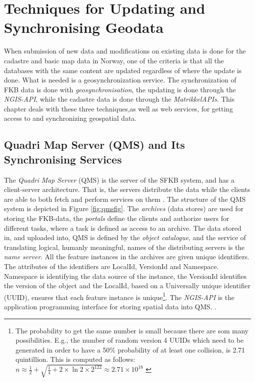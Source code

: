 \chapter{Techniques for Updating and Synchronising Geodata} \label{chap:tech}
When submission of new data and modifications on existing data is done for the cadastre and basic map data in Norway, one of the criteria is that all the databases with the same content are updated regardless of where the update is done. What is needed is a geosynchronization service. The synchronization of FKB data is done with \textit{geosynchronisation}, the updating is done through the \textit{NGIS-API}, while the cadastre data is done through the \textit{MatrikkelAPIs}.  This chapter deals with these three techniques,as well as web services, for getting access to and synchronizing geospatial data.  


\section{Quadri Map Server (QMS) and Its Synchronising Services}\label{ngis}
The \textit{Quadri Map Server} (QMS) is the server of the SFKB system,
and has a client-server architecture. That is, the servers distribute the data while the clients are able to both fetch and perform services on them \citep{NorkartAS2010}. 
The structure of the QMS system
is depicted in Figure \ref{fig:qmsfig}. The \textit{archives} (data stores) are used for storing the FKB-data, the \textit{portals} define the clients and authorize users for different tasks, where a task is defined as access to an archive. The data stored in, and uploaded into, QMS is defined by the \textit{object catalogue}, and the service of translating logical, humanly meaningful, names of the distributing servers is the \textit{name server}. All the feature instances in the archives are given unique identifiers. The attributes of the identifiers are LocalId, VersionId and Namespace. Namespace is identifying the data source of the instance, the VersionId identifies the version of the object and the LocalId, based on a Universally unique identifier (UUID), ensures that each feature instance is unique\footnote{The probability to get the same number is small because there are som many possibilities. E.g., the number of random version 4 UUIDs which need to be generated in order to have a 50\% probability of at least one collision, is 2.71 quintillion. This is computed as follows: $ n \approx \frac{1}{2} + \sqrt{\frac{1}{4}+2 \times \ln{2} \times  2^{122}} \approx 2.71 \times 10^{18} $ \citep{Eggan2017}}. 
The \textit{NGIS-API} is the application programming interface for storing spatial data into QMS. 
.

